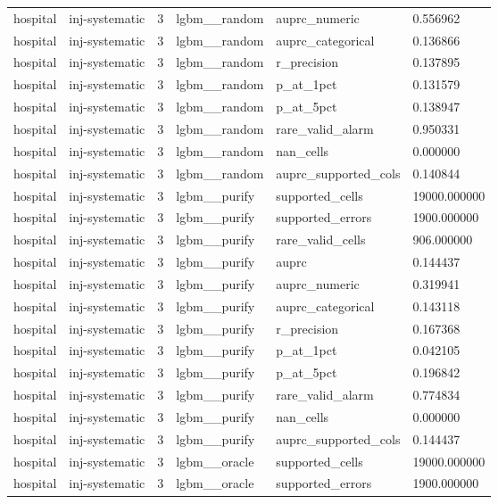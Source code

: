 \begin{tabular}{llllll}
hospital & inj-systematic & 3 & lgbm\_\_random & auprc\_numeric & 0.556962 \\
hospital & inj-systematic & 3 & lgbm\_\_random & auprc\_categorical & 0.136866 \\
hospital & inj-systematic & 3 & lgbm\_\_random & r\_precision & 0.137895 \\
hospital & inj-systematic & 3 & lgbm\_\_random & p\_at\_1pct & 0.131579 \\
hospital & inj-systematic & 3 & lgbm\_\_random & p\_at\_5pct & 0.138947 \\
hospital & inj-systematic & 3 & lgbm\_\_random & rare\_valid\_alarm & 0.950331 \\
hospital & inj-systematic & 3 & lgbm\_\_random & nan\_cells & 0.000000 \\
hospital & inj-systematic & 3 & lgbm\_\_random & auprc\_supported\_cols & 0.140844 \\
hospital & inj-systematic & 3 & lgbm\_\_purify & supported\_cells & 19000.000000 \\
hospital & inj-systematic & 3 & lgbm\_\_purify & supported\_errors & 1900.000000 \\
hospital & inj-systematic & 3 & lgbm\_\_purify & rare\_valid\_cells & 906.000000 \\
hospital & inj-systematic & 3 & lgbm\_\_purify & auprc & 0.144437 \\
hospital & inj-systematic & 3 & lgbm\_\_purify & auprc\_numeric & 0.319941 \\
hospital & inj-systematic & 3 & lgbm\_\_purify & auprc\_categorical & 0.143118 \\
hospital & inj-systematic & 3 & lgbm\_\_purify & r\_precision & 0.167368 \\
hospital & inj-systematic & 3 & lgbm\_\_purify & p\_at\_1pct & 0.042105 \\
hospital & inj-systematic & 3 & lgbm\_\_purify & p\_at\_5pct & 0.196842 \\
hospital & inj-systematic & 3 & lgbm\_\_purify & rare\_valid\_alarm & 0.774834 \\
hospital & inj-systematic & 3 & lgbm\_\_purify & nan\_cells & 0.000000 \\
hospital & inj-systematic & 3 & lgbm\_\_purify & auprc\_supported\_cols & 0.144437 \\
hospital & inj-systematic & 3 & lgbm\_\_oracle & supported\_cells & 19000.000000 \\
hospital & inj-systematic & 3 & lgbm\_\_oracle & supported\_errors & 1900.000000 \\

\end{tabular}
